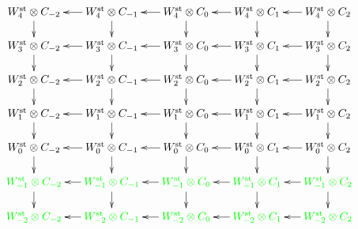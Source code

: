 
\[
	\xymatrix@R=.5cm@C=.5cm{
		\Wst[4] \ot C_{-2}\ar[d] &
		\Wst[4] \ot C_{-1}\ar[d]\ar[l] &
		\Wst[4] \ot C_{0}\ar[d]\ar[l] &
		\Wst[4] \ot C_{1}\ar[d]\ar[l] &
		\Wst[4] \ot C_{2}\ar[d]\ar[l]
		\\
		\Wst[3] \ot C_{-2}\ar[d] &
		\Wst[3] \ot C_{-1}\ar[d]\ar[l] &
		\Wst[3] \ot C_{0}\ar[d]\ar[l] &
		\Wst[3] \ot C_{1}\ar[d]\ar[l] &
		\Wst[3] \ot C_{2}\ar[d]\ar[l]
		\\
		\Wst[2] \ot C_{-2}\ar[d] &
		\Wst[2] \ot C_{-1}\ar[d]\ar[l] &
		\Wst[2] \ot C_{0}\ar[d]\ar[l] &
		\Wst[2] \ot C_{1}\ar[d]\ar[l] &
		\Wst[2] \ot C_{2}\ar[d]\ar[l]
		\\
		\Wst[1] \ot C_{-2}\ar[d] &
		\Wst[1] \ot C_{-1}\ar[d]\ar[l] &
		\Wst[1] \ot C_{0}\ar[d]\ar[l] &
		\Wst[1] \ot C_{1}\ar[d]\ar[l] &
		\Wst[1] \ot C_{2}\ar[d]\ar[l]
		\\
		\Wst[0] \ot C_{-2}\ar[d] &
		\Wst[0] \ot C_{-1}\ar[d]\ar[l] &
		\Wst[0] \ot C_{0}\ar[d]\ar[l] &
		\Wst[0] \ot C_{1}\ar[d]\ar[l] &
		\Wst[0] \ot C_{2}\ar[d]\ar[l]
		\\
		\green{\Wst[-1] \ot C_{-2}}\ar[d] &
		\green{\Wst[-1] \ot C_{-1}}\ar[d]\ar[l] &
		\green{\Wst[-1] \ot C_{0}}\ar[d]\ar[l] &
		\green{\Wst[-1] \ot C_{1}}\ar[d]\ar[l] &
		\green{\Wst[-1] \ot C_{2}}\ar[d]\ar[l]
		\\
		\green{\Wst[-2] \ot C_{-2}} &
		\green{\Wst[-2] \ot C_{-1}}\ar[l] &
		\green{\Wst[-2] \ot C_{0}}\ar[l] &
		\green{\Wst[-2] \ot C_{1}}\ar[l] &
		\green{\Wst[-2] \ot C_{2}}\ar[l]
}
\]
